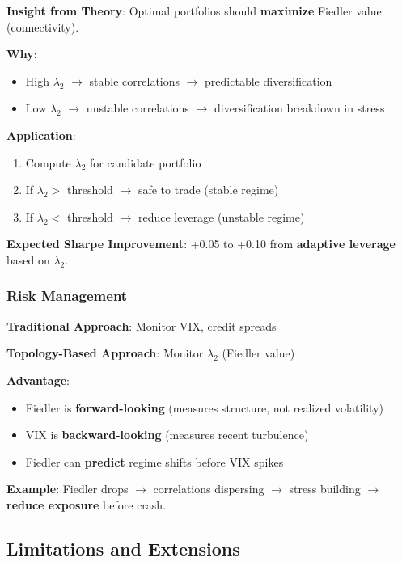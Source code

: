 \textbf{Insight from Theory}: Optimal portfolios should \textbf{maximize} Fiedler value (connectivity).

\textbf{Why}:
\begin{itemize}
\item High $\lambda_2$ $\rightarrow$ stable correlations $\rightarrow$ predictable diversification
\item Low $\lambda_2$ $\rightarrow$ unstable correlations $\rightarrow$ diversification breakdown in stress
\end{itemize}

\textbf{Application}:
\begin{enumerate}
\item Compute $\lambda_2$ for candidate portfolio
\item If $\lambda_2 >$ threshold $\rightarrow$ safe to trade (stable regime)
\item If $\lambda_2 <$ threshold $\rightarrow$ reduce leverage (unstable regime)
\end{enumerate}

\textbf{Expected Sharpe Improvement}: +0.05 to +0.10 from \textbf{adaptive leverage} based on $\lambda_2$.

\subsubsection{Risk Management}

\textbf{Traditional Approach}: Monitor VIX, credit spreads

\textbf{Topology-Based Approach}: Monitor $\lambda_2$ (Fiedler value)

\textbf{Advantage}:
\begin{itemize}
\item Fiedler is \textbf{forward-looking} (measures structure, not realized volatility)
\item VIX is \textbf{backward-looking} (measures recent turbulence)
\item Fiedler can \textbf{predict} regime shifts before VIX spikes
\end{itemize}

\textbf{Example}: Fiedler drops $\rightarrow$ correlations dispersing $\rightarrow$ stress building $\rightarrow$ \textbf{reduce exposure} before crash.

\subsection{Limitations and Extensions}

